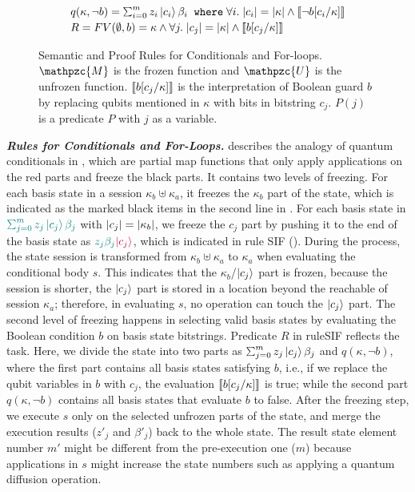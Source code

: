 \begin{figure}[t]
{\begin{mathpar}
  \end{mathpar}
}
{\footnotesize
\[
\begin{array}{l}
q(\kappa,\neg b) = \schai{m}{z_i}{c_{i}}{\beta_i}
\;\;\texttt{where}\;\forall i.\;\slen{c_{i}}=\slen{\kappa}\wedge \denote{\neg b[c_{i}/\kappa]}
\\[0.2em]
R = FV(\emptyset,b)=\kappa \wedge \forall j.\; \slen{c_{j}}=\slen{\kappa}\wedge\denote{b[c_{j}/\kappa]}
\end{array}
\]
}
\caption{Semantic and Proof Rules for Conditionals and For-loops. $\mathpzc{M}$ is the frozen function and $\mathpzc{U}$ is the unfrozen function. $\denote{b[c_{j}/\kappa]}$ is the interpretation of Boolean guard $b$ by replacing qubits mentioned in $\kappa$ with bits in bitstring $c_{j}$.  $P(j)$ is a predicate $P$ with $j$ as a variable. }
\label{fig:qafny-mu-rules}
\end{figure}

\noindent\textbf{\textit{Rules for Conditionals and For-Loops.}}\label{sec:conditionals}
 describes the analogy of quantum conditionals in \qafny, which are partial map functions that only apply applications on the red parts and freeze the black parts.
It contains two levels of freezing. For each basis state in a session $\kappa_b\uplus \kappa_a$, it freezes the $\kappa_b$ part of the state, which is indicated as the marked black items in the second line in . For each basis state in $\textcolor{teal}{\scha{m}{z_j}{c_{j}}{\beta_j}}$ with $\slen{c_{j}} = \slen{\kappa_b}$, we freeze the $c_{j}$ part by pushing it to the end of the basis state as $\textcolor{teal}{z_j\beta_j}\textcolor{purple}{\ket{c_{j}}}$, which is indicated in rule \textsc{SIF} (). 
During the process, the state session is transformed from $\kappa_b\uplus \kappa_a$ to $\kappa_a$ when evaluating the conditional body $s$. This indicates that the $\kappa_b$/$\ket{c_{j}}$ part is frozen, because the session is shorter, the $\ket{c_{j}}$ part is stored in a location beyond the reachable of session $\kappa_a$; therefore, in evaluating $s$, no operation can touch the $\ket{c_{j}}$ part.
The second level of freezing happens in selecting valid basis states by evaluating the Boolean condition $b$ on basis state bitstrings. Predicate $R$ in rule\textsc{SIF} reflects the task.
Here, we divide the state into two parts as $\scha{m}{z_j}{c_{j}}{\beta_j}$ and $q(\kappa,\neg b)$, where the first part contains all basis states satisfying $b$, i.e., if we replace the qubit variables in $b$ with $c_{j}$, the evaluation $\denote{b[c_{j}/\kappa]}$ is true; while the second part $q(\kappa,\neg b)$ contains all basis states that evaluate $b$ to false.
After the freezing step, we execute $s$ only on the selected unfrozen parts of the state, and merge the execution results ($z'_j$ and $\beta'_j$) back to the whole state.
The result state element number $m'$ might be different from the pre-execution one ($m$) because applications in $s$ might increase the state numbers such as applying a quantum diffusion operation.

